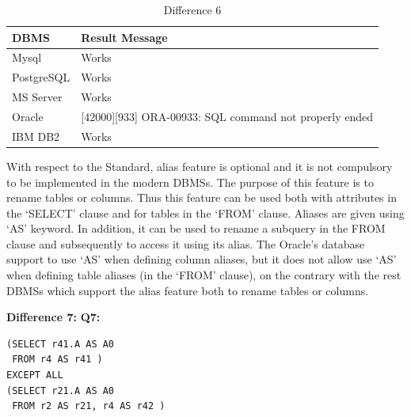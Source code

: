 \begin{table}[h]
\centering
\caption{Difference 6}
\label{my-label}
\begin{tabular}{|p{2cm}|p{11.5cm}| }
\hline
\textbf{DBMS} & \textbf{Result Message}                                        \\ \hline
Mysql         & Works                                                          \\ \hline
PostgreSQL    & Works                                                          \\ \hline
MS Server     & Works                                                          \\ \hline
Oracle        & {[}42000{]}{[}933{]} ORA-00933: SQL command not properly ended \\ \hline
IBM DB2       & Works                                                          \\ \hline
\end{tabular}
\end{table}

With respect to the Standard, alias feature is optional and it is not compulsory to be implemented in the modern DBMSs. The purpose of this feature is to rename tables or columns. Thus this feature can be used both with attributes in the ‘SELECT’ clause and for tables in the ‘FROM’ clause. Aliases are given using ‘AS’ keyword. In addition, it can be used to rename a subquery in the FROM clause and subsequently to access it using its alias. The Oracle’s database support to use ‘AS’ when defining column aliases, but it does not allow use ‘AS’ when defining table aliases (in the ‘FROM’ clause), on the contrary with the rest DBMSs which support the alias feature both to rename tables or columns. 


\hfill\newline\textbf{Difference 7:}
\hfill\newline\textbf{Q7:}

\begin{mdframed}[backgroundcolor=lightgray!20]
\begin{lstlisting}[style=SQL]
(SELECT r41.A AS A0
 FROM r4 AS r41 ) 
EXCEPT ALL
(SELECT r21.A AS A0
 FROM r2 AS r21, r4 AS r42 )
\end{lstlisting}
\end{mdframed}

